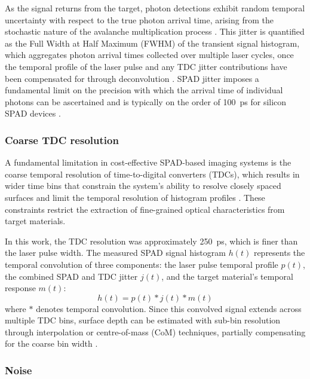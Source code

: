 \documentclass[12pt,a4paper,oneside]{report}
\begin{document}
As the signal returns from the target, photon detections exhibit random temporal uncertainty with respect to the true photon arrival time, arising from the stochastic nature of the avalanche multiplication process \cite{itzler2011,gyongy2022}. This jitter is quantified as the Full Width at Half Maximum (FWHM) of the transient signal histogram, which aggregates photon arrival times collected over multiple laser cycles, once the temporal profile of the laser pulse and any TDC jitter contributions have been compensated for through deconvolution \cite{sesta2023,piron2020}. SPAD jitter imposes a fundamental limit on the precision with which the arrival time of individual photons can be ascertained and is typically on the order of 100~ps for silicon SPAD devices \cite{itzler2011}.

\subsubsection{Coarse TDC resolution}
\label{subsubsec:coarse_tdc_resolution}

A fundamental limitation in cost-effective SPAD-based imaging systems is the coarse temporal resolution of time-to-digital converters (TDCs), which results in wider time bins that constrain the system's ability to resolve closely spaced surfaces and limit the temporal resolution of histogram profiles \cite{sesta2023}. These constraints restrict the extraction of fine-grained optical characteristics from target materials.

In this work, the TDC resolution was approximately 250~ps, which is finer than the laser pulse width. The measured SPAD signal histogram $h(t)$ represents the temporal convolution of three components: the laser pulse temporal profile $p(t)$, the combined SPAD and TDC jitter $j(t)$, and the target material's temporal response $m(t)$:
\begin{equation}
h(t) = p(t) \ast j(t) \ast m(t)
\label{eq:spad_histogram_convolution}
\end{equation}
where $\ast$ denotes temporal convolution. Since this convolved signal extends across multiple TDC bins, surface depth can be estimated with sub-bin resolution through interpolation or centre-of-mass (CoM) techniques, partially compensating for the coarse bin width \cite{erdogan2017,zhang2019}.

\subsubsection{Noise}
\label{subsubsec:noise}
\end{document}
